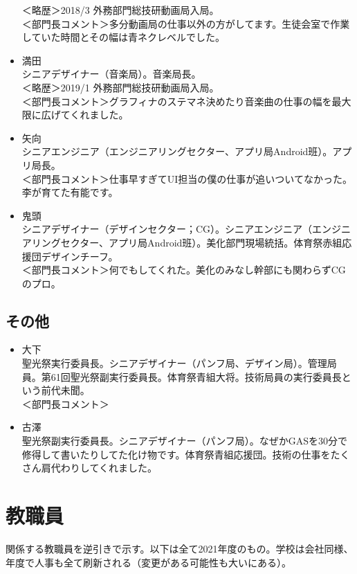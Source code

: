 \documentclass[dvipdfmx,jb5]{jreport}
\begin{document}
\begin{itemize}
            ＜略歴＞2018/3 外務部門総技研動画局入局。\\
            ＜部門長コメント＞多分動画局の仕事以外の方がしてます。生徒会室で作業していた時間とその幅は青ネクレベルでした。
      \item 満田\\
            シニアデザイナー（音楽局）。音楽局長。\\
            ＜略歴＞2019/1 外務部門総技研動画局入局。\\
            ＜部門長コメント＞グラフィナのステマネ決めたり音楽曲の仕事の幅を最大限に広げてくれました。
      \item 矢向\\
            シニアエンジニア（エンジニアリングセクター、アプリ局Android班）。アプリ局長。\\
            ＜部門長コメント＞仕事早すぎてUI担当の僕の仕事が追いついてなかった。李が育てた有能です。
      \item 鬼頭\\
            シニアデザイナー（デザインセクター；CG）。シニアエンジニア（エンジニアリングセクター、アプリ局Android班）。美化部門現場統括。体育祭赤組応援団デザインチーフ。\\
            ＜部門長コメント＞何でもしてくれた。美化のみなし幹部にも関わらずCGのプロ。
\end{itemize}
\subsection{その他}
\begin{itemize}
      \item 大下\\
            聖光祭実行委員長。シニアデザイナー（パンフ局、デザイン局）。管理局員。第61回聖光祭副実行委員長。体育祭青組大将。技術局員の実行委員長という前代未聞。\\
            ＜部門長コメント＞
      \item 古澤\\
            聖光祭副実行委員長。シニアデザイナー（パンフ局）。なぜかGASを30分で修得して書いたりしてた化け物です。体育祭青組応援団。技術の仕事をたくさん肩代わりしてくれました。
\end{itemize}
\section{教職員}
関係する教職員を逆引きで示す。以下は全て2021年度のもの。学校は会社同様、年度で人事も全て刷新される（変更がある可能性も大いにある）。
\end{document}
